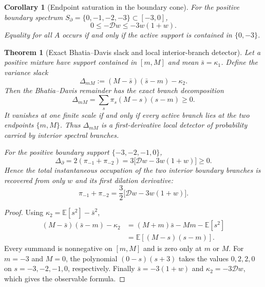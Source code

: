 \documentclass[aps,prd,preprint,onecolumn,nofootinbib,superscriptaddress,showkeys]{revtex4-2}
\numberwithin{equation}{section}
\theoremstyle{definition}
\theoremstyle{plain}
\newtheorem{theorem}{Theorem}[section]
\newtheorem{corollary}{Corollary}[section]
\newcommand{\Dil}{\mathscr D}
\begin{document}
\begin{corollary}[Endpoint saturation in the boundary cone]
For the positive boundary spectrum \(S_\partial=\{0,-1,-2,-3\}\subset[-3,0]\),
\begin{equation}
0\le-\Dil w\le -3w(1+w).
\end{equation}
Equality for all \(A\) occurs if and only if the active support is contained in \(\{0,-3\}\).
\end{corollary}

\begin{theorem}[Exact Bhatia--Davis slack and local interior-branch detector]\label{thm:bd-slack}
Let a positive mixture have support contained in $[m,M]$ and mean $\bar s=\kappa_1$.  Define the variance slack
\begin{equation}
\Delta_{mM}
:=(M-\bar s)(\bar s-m)-\kappa_2.
\end{equation}
Then the Bhatia--Davis remainder has the exact branch decomposition
\begin{equation}
\boxed{
\Delta_{mM}
=\sum_s\pi_s(M-s)(s-m)\ge0.
}
\end{equation}
It vanishes at one finite scale if and only if every active branch lies at the two endpoints $\{m,M\}$.  Thus $\Delta_{mM}$ is a first-derivative local detector of probability carried by interior spectral branches.

For the positive boundary support $\{-3,-2,-1,0\}$,
\begin{equation}
\boxed{
\Delta_{\partial}
=2(\pi_{-1}+\pi_{-2})
=3\bigl[\Dil w-3w(1+w)\bigr]\ge0.
}
\end{equation}
Hence the total instantaneous occupation of the two interior boundary branches is recovered from only $w$ and its first dilation derivative:
\begin{equation}
\boxed{
\pi_{-1}+\pi_{-2}
=\frac32\bigl[\Dil w-3w(1+w)\bigr].
}
\end{equation}
\end{theorem}

\begin{proof}
Using $\kappa_2=\mathbb E[s^2]-\bar s^2$,
\begin{align*}
(M-\bar s)(\bar s-m)-\kappa_2
&=(M+m)\bar s-Mm-\mathbb E[s^2]\\
&=\mathbb E\!\left[(M-s)(s-m)\right].
\end{align*}
Every summand is nonnegative on $[m,M]$ and is zero only at $m$ or $M$.  For $m=-3$ and $M=0$, the polynomial $(0-s)(s+3)$ takes the values $0,2,2,0$ on $s=-3,-2,-1,0$, respectively.  Finally $\bar s=-3(1+w)$ and $\kappa_2=-3\Dil w$, which gives the observable formula.
\end{proof}
\end{document}
